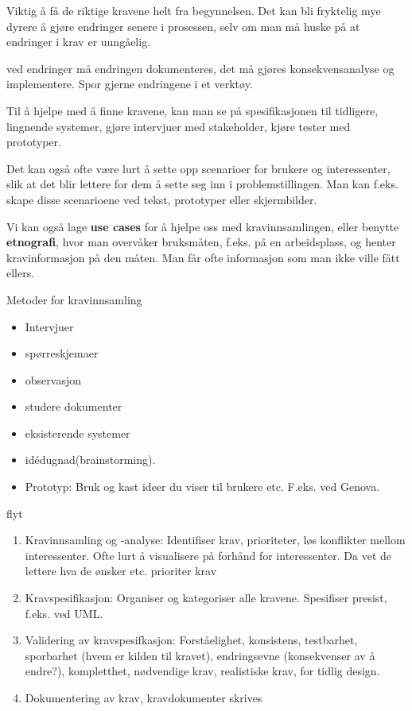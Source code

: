 \documentclass[11pt]{article}
\begin{document}
   Viktig å få de riktige kravene helt fra begynnelsen. Det kan bli 
   fryktelig mye dyrere å gjøre endringer senere i prosessen, selv om
   man må huske på at endringer i krav er uungåelig.
   
   ved endringer må endringen dokumenteres, det må gjøres konsekvensanalyse 
   og implementere. Spor gjerne endringene i et verktøy.

   Til å hjelpe med å finne kravene, kan man se på spesifikasjonen til
   tidligere, lingnende systemer, gjøre intervjuer med stakeholder, kjøre
   tester med prototyper. 

   Det kan også ofte være lurt å sette opp scenarioer for brukere og
   interessenter, slik at det blir lettere for dem å sette seg inn i
   problemstillingen. Man kan f.eks. skape disse scenarioene ved tekst,
   prototyper eller skjermbilder. 

   Vi kan også lage \textbf{use cases} for å hjelpe oss med kravinnsamlingen,
   eller benytte \textbf{etnografi}, hvor man overvåker bruksmåten, f.eks. på en
   arbeidsplass, og henter kravinformasjon på den måten. Man får ofte
   informasjon som man ikke ville fått ellers.
   
   Metoder for kravinnsamling  
\begin{itemize}
\item Intervjuer
\item spørreskjemaer
\item observasjon
\item studere dokumenter
\item eksisterende systemer
\item idédugnad(brainstorming).
\item Prototyp: Bruk og kast ideer du viser til brukere etc. F.eks. ved Genova.
\end{itemize}

   flyt

\begin{enumerate}
\item Kravinnsamling og -analyse: 
      Identifiser krav, prioriteter, løs konflikter mellom interessenter. 
      Ofte lurt å visualisere på forhånd for interessenter. Da vet de lettere hva de ønsker etc.
      prioriter krav
\item Kravspesifikasjon: 
      Organiser og kategoriser alle kravene.
      Spesifiser presist, f.eks. ved UML.
\item Validering av kravspesifkasjon: 
      Forståelighet, konsistens, testbarhet, sporbarhet (hvem er kilden til kravet), 
      endringsevne (konsekvenser av å endre?), kompletthet, 
      nødvendige krav, realistiske krav, for tidlig design.
\item Dokumentering av krav, kravdokumenter skrives
\end{enumerate}
      
\end{document}
